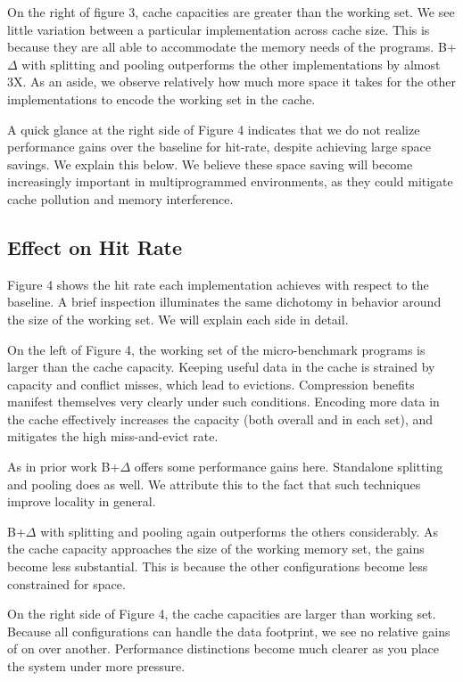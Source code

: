 \documentclass[pageno]{jpaper}
\begin{document}
On the right of figure 3, cache capacities are greater than the working set. We see little variation between a particular implementation across cache size. This is because they are all able to accommodate the memory needs of the programs. B+$\Delta$ with splitting and pooling outperforms the other implementations by almost 3X. As an aside, we observe relatively how much more space it takes for the other implementations to encode the working set in the cache.

A quick glance at the right side of Figure 4 indicates that we do not realize performance gains over the baseline for hit-rate, despite achieving large space savings. We explain this below. We believe these space saving will become increasingly important in multiprogrammed environments, as they could mitigate cache pollution and memory interference.

\subsection{Effect on Hit Rate}

Figure 4 shows the hit rate each implementation achieves with respect to the baseline. A brief inspection illuminates the same dichotomy in behavior around the size of the working set. We will explain each side in detail. 

On the left of Figure 4, the working set of the micro-benchmark programs is larger than the cache capacity. Keeping useful data in the cache is strained by capacity and conflict misses, which lead to evictions. Compression benefits manifest themselves very clearly under such conditions. Encoding more data in the cache effectively increases the capacity (both overall and in each set), and mitigates the high miss-and-evict rate.

As in prior work B+$\Delta$ offers some performance gains here. Standalone splitting and pooling does as well. We attribute this to the fact that such techniques improve locality in general.

B+$\Delta$ with splitting and pooling again outperforms the others considerably. As the cache capacity approaches the size of the working memory set, the gains become less substantial. This is because the other configurations become less constrained for space.

On the right side of Figure 4, the cache capacities are larger than working set. Because all configurations can handle the data footprint, we see no relative gains of on over another. Performance distinctions become much clearer as you place the system under more pressure.
\end{document}
